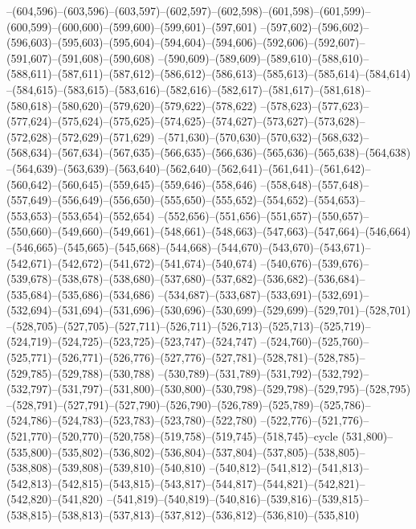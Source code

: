 --(604,596)--(603,596)--(603,597)--(602,597)--(602,598)--(601,598)--(601,599)--(600,599)--(600,600)--(599,600)--(599,601)--(597,601)
--(597,602)--(596,602)--(596,603)--(595,603)--(595,604)--(594,604)--(594,606)--(592,606)--(592,607)--(591,607)--(591,608)--(590,608)
--(590,609)--(589,609)--(589,610)--(588,610)--(588,611)--(587,611)--(587,612)--(586,612)--(586,613)--(585,613)--(585,614)--(584,614)
--(584,615)--(583,615)--(583,616)--(582,616)--(582,617)--(581,617)--(581,618)--(580,618)--(580,620)--(579,620)--(579,622)--(578,622)
--(578,623)--(577,623)--(577,624)--(575,624)--(575,625)--(574,625)--(574,627)--(573,627)--(573,628)--(572,628)--(572,629)--(571,629)
--(571,630)--(570,630)--(570,632)--(568,632)--(568,634)--(567,634)--(567,635)--(566,635)--(566,636)--(565,636)--(565,638)--(564,638)
--(564,639)--(563,639)--(563,640)--(562,640)--(562,641)--(561,641)--(561,642)--(560,642)--(560,645)--(559,645)--(559,646)--(558,646)
--(558,648)--(557,648)--(557,649)--(556,649)--(556,650)--(555,650)--(555,652)--(554,652)--(554,653)--(553,653)--(553,654)--(552,654)
--(552,656)--(551,656)--(551,657)--(550,657)--(550,660)--(549,660)--(549,661)--(548,661)--(548,663)--(547,663)--(547,664)--(546,664)
--(546,665)--(545,665)--(545,668)--(544,668)--(544,670)--(543,670)--(543,671)--(542,671)--(542,672)--(541,672)--(541,674)--(540,674)
--(540,676)--(539,676)--(539,678)--(538,678)--(538,680)--(537,680)--(537,682)--(536,682)--(536,684)--(535,684)--(535,686)--(534,686)
--(534,687)--(533,687)--(533,691)--(532,691)--(532,694)--(531,694)--(531,696)--(530,696)--(530,699)--(529,699)--(529,701)--(528,701)
--(528,705)--(527,705)--(527,711)--(526,711)--(526,713)--(525,713)--(525,719)--(524,719)--(524,725)--(523,725)--(523,747)--(524,747)
--(524,760)--(525,760)--(525,771)--(526,771)--(526,776)--(527,776)--(527,781)--(528,781)--(528,785)--(529,785)--(529,788)--(530,788)
--(530,789)--(531,789)--(531,792)--(532,792)--(532,797)--(531,797)--(531,800)--(530,800)--(530,798)--(529,798)--(529,795)--(528,795)
--(528,791)--(527,791)--(527,790)--(526,790)--(526,789)--(525,789)--(525,786)--(524,786)--(524,783)--(523,783)--(523,780)--(522,780)
--(522,776)--(521,776)--(521,770)--(520,770)--(520,758)--(519,758)--(519,745)--(518,745)--cycle
(531,800)--(535,800)--(535,802)--(536,802)--(536,804)--(537,804)--(537,805)--(538,805)--(538,808)--(539,808)--(539,810)--(540,810)
--(540,812)--(541,812)--(541,813)--(542,813)--(542,815)--(543,815)--(543,817)--(544,817)--(544,821)--(542,821)--(542,820)--(541,820)
--(541,819)--(540,819)--(540,816)--(539,816)--(539,815)--(538,815)--(538,813)--(537,813)--(537,812)--(536,812)--(536,810)--(535,810)
